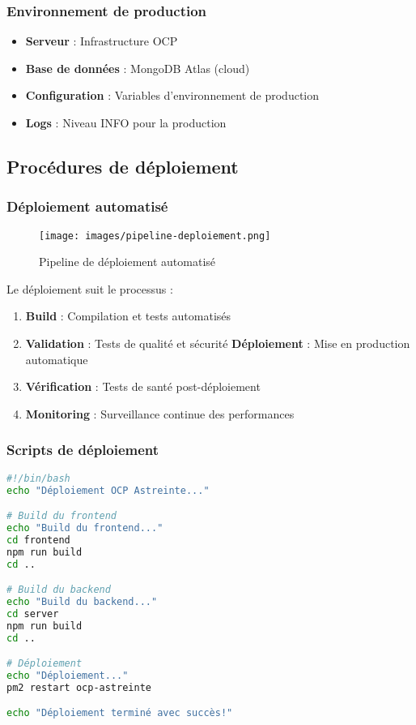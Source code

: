 \subsubsection{Environnement de production}
\begin{itemize}
    \item \textbf{Serveur} : Infrastructure OCP
    \item \textbf{Base de données} : MongoDB Atlas (cloud)
    \item \textbf{Configuration} : Variables d'environnement de production
    \item \textbf{Logs} : Niveau INFO pour la production
\end{itemize}

\subsection{Procédures de déploiement}
\subsubsection{Déploiement automatisé}
\begin{figure}[h]
\centering
\texttt{[image: images/pipeline-deploiement.png]}
\caption{Pipeline de déploiement automatisé}
\label{fig:pipeline-deploiement}
\end{figure}

Le déploiement suit le processus :
\begin{enumerate}
    \item \textbf{Build} : Compilation et tests automatisés
    \item \textbf{Validation} : Tests de qualité et sécurité
    \textbf{Déploiement} : Mise en production automatique
    \item \textbf{Vérification} : Tests de santé post-déploiement
    \item \textbf{Monitoring} : Surveillance continue des performances
\end{enumerate}

\subsubsection{Scripts de déploiement}
\begin{lstlisting}[language=bash, caption=Script de déploiement]
#!/bin/bash
echo "Déploiement OCP Astreinte..."

# Build du frontend
echo "Build du frontend..."
cd frontend
npm run build
cd ..

# Build du backend
echo "Build du backend..."
cd server
npm run build
cd ..

# Déploiement
echo "Déploiement..."
pm2 restart ocp-astreinte

echo "Déploiement terminé avec succès!"
\end{lstlisting}

